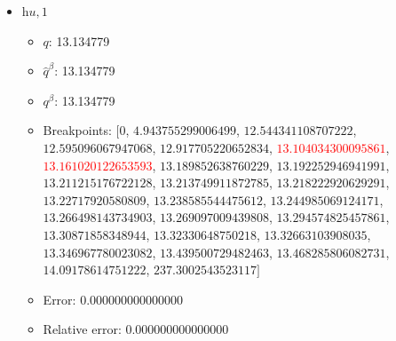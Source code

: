 \documentclass{article}%
\begin{document}
\begin{itemize}
\begin{itemize}
		\item Error: 0.000000000000000%
		\item Relative error: 0.000000000000000%
	\end{itemize}%
	\item $\textit{hu},1$%
	\begin{itemize}%
		\item $q$: 13.134779%
		\item $\hat{q}^\beta$: 13.134779%
		\item $q^\beta$: 13.134779%
		\item Breakpoints: $[$$0$, $4.943755299006499$, $12.544341108707222$, $12.595096067947068$, $12.917705220652834$, \textcolor{red}{$13.104034300095861$}, \textcolor{red}{$13.161020122653593$}, $13.189852638760229$, $13.192252946941991$, $13.211215176722128$, $13.213749911872785$, $13.218222920629291$, $13.22717920580809$, $13.238585544475612$, $13.244985069124171$, $13.266498143734903$, $13.269097009439808$, $13.294574825457861$, $13.30871858348944$, $13.32330648750218$, $13.32663103908035$, $13.346967780023082$, $13.439500729482463$, $13.468285806082731$, $14.09178614751222$, $237.3002543523117$$]$%
		\item Error: 0.000000000000000%
		\item Relative error: 0.000000000000000%
	\end{itemize}%
\end{itemize}%
\end{document}
